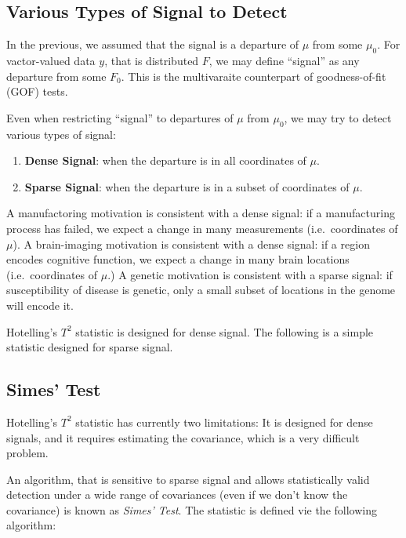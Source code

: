 \documentclass[]{book}
\providecommand{\tightlist}{%
  \setlength{\itemsep}{0pt}\setlength{\parskip}{0pt}}
\theoremstyle{definition}
\theoremstyle{definition}
\theoremstyle{definition}
\theoremstyle{remark}
\begin{document}
\subsection{Various Types of Signal to
Detect}\label{various-types-of-signal-to-detect}

In the previous, we assumed that the signal is a departure of \(\mu\)
from some \(\mu_0\). For vactor-valued data \(y\), that is distributed
\(F\), we may define ``signal'' as any departure from some \(F_0\). This
is the multivaraite counterpart of goodness-of-fit (GOF) tests.

Even when restricting ``signal'' to departures of \(\mu\) from
\(\mu_0\), we may try to detect various types of signal:

\begin{enumerate}
\def\labelenumi{\arabic{enumi}.}
\tightlist
\item
  \textbf{Dense Signal}: when the departure is in all coordinates of
  \(\mu\).
\item
  \textbf{Sparse Signal}: when the departure is in a subset of
  coordinates of \(\mu\).
\end{enumerate}

A manufactoring motivation is consistent with a dense signal: if a
manufacturing process has failed, we expect a change in many
measurements (i.e.~coordinates of \(\mu\)). A brain-imaging motivation
is consistent with a dense signal: if a region encodes cognitive
function, we expect a change in many brain locations (i.e.~coordinates
of \(\mu\).) A genetic motivation is consistent with a sparse signal: if
susceptibility of disease is genetic, only a small subset of locations
in the genome will encode it.

Hotelling's \(T^2\) statistic is designed for dense signal. The
following is a simple statistic designed for sparse signal.

\subsection{Simes' Test}\label{simes-test}

Hotelling's \(T^2\) statistic has currently two limitations: It is
designed for dense signals, and it requires estimating the covariance,
which is a very difficult problem.

An algorithm, that is sensitive to sparse signal and allows
statistically valid detection under a wide range of covariances (even if
we don't know the covariance) is known as \emph{Simes' Test}. The
statistic is defined vie the following algorithm:
\end{document}
